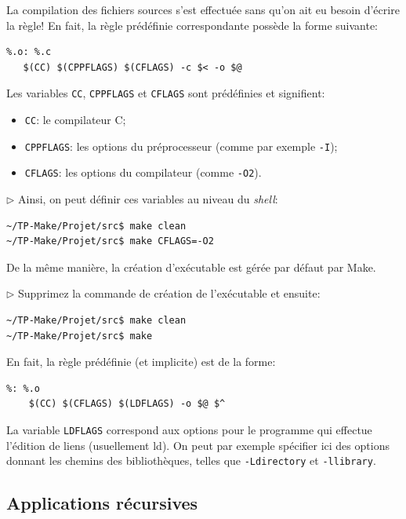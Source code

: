 \documentclass[11pt,a4paper]{article}
\newcommand{\must}{\noindent $\triangleright$ \xspace}
\newcommand{\bitem}{\item[$\bullet$]}
\begin{document}
\noindent La compilation des fichiers sources s'est effectuée sans
qu'on ait eu besoin d'écrire la règle! En fait, la règle
prédéfinie correspondante possède la forme suivante:
{\small
\begin{verbatim}
%.o: %.c
   $(CC) $(CPPFLAGS) $(CFLAGS) -c $< -o $@
\end{verbatim}
}
\noindent Les variables \texttt{\small CC}, \texttt{\small CPPFLAGS} et
\texttt{\small CFLAGS} sont prédéfinies et signifient:

\begin{itemize}

  \bitem \texttt{\small CC}: le compilateur C;

  \bitem \texttt{\small CPPFLAGS}: les options du préprocesseur (comme
  par exemple \texttt{-I});

  \bitem \texttt{\small CFLAGS}: les options du compilateur (comme
  \texttt{-O2}).

\end{itemize}

\medskip

\must Ainsi, on peut définir ces variables au niveau du \emph{shell}:
{\small
\begin{verbatim}
~/TP-Make/Projet/src$ make clean
~/TP-Make/Projet/src$ make CFLAGS=-O2
\end{verbatim}
}

\noindent De la même manière, la création d'exécutable est gérée par
défaut par \textsf{Make}.

\medskip

\must Supprimez la commande de création de l'exécutable et ensuite:
{\small
\begin{verbatim}
~/TP-Make/Projet/src$ make clean
~/TP-Make/Projet/src$ make
\end{verbatim}
}

\noindent En fait, la règle prédéfinie (et implicite) est de la forme:
{\small
\begin{verbatim}
%: %.o
    $(CC) $(CFLAGS) $(LDFLAGS) -o $@ $^
\end{verbatim}
}

\noindent La variable \texttt{\small LDFLAGS} correspond aux options
pour le programme qui effectue l'édition de liens (usuellement
\textsf{ld}). On peut par exemple spécifier ici des options donnant
les chemins des bibliothèques, telles que \texttt{-Ldirectory} et
\texttt{-llibrary}.

\subsection{Applications récursives}
\end{document}
